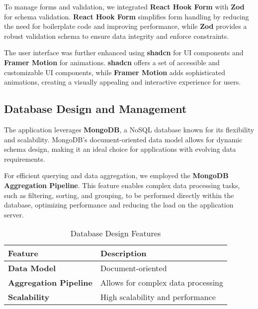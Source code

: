 To manage forms and validation, we integrated \textbf{React Hook Form} with \textbf{Zod} for schema validation. \textbf{React Hook Form} simplifies form handling by reducing the need for boilerplate code and improving performance, while \textbf{Zod} provides a robust validation schema to ensure data integrity and enforce constraints. 


The user interface was further enhanced using \textbf{shadcn} for UI components and \textbf{Framer Motion} for animations. \textbf{shadcn} offers a set of accessible and customizable UI components, while \textbf{Framer Motion} adds sophisticated animations, creating a visually appealing and interactive experience for users.

\subsection{Database Design and Management}

The application leverages \textbf{MongoDB}, a NoSQL database known for its flexibility and scalability. MongoDB's document-oriented data model allows for dynamic schema design, making it an ideal choice for applications with evolving data requirements.

For efficient querying and data aggregation, we employed the \textbf{MongoDB Aggregation Pipeline}. This feature enables complex data processing tasks, such as filtering, sorting, and grouping, to be performed directly within the database, optimizing performance and reducing the load on the application server.

\begin{table}[h]
\centering
\begin{tabular}{|l|l|}
\hline
\textbf{Feature} & \textbf{Description} \\
\hline
\textbf{Data Model} & Document-oriented \\
\textbf{Aggregation Pipeline} & Allows for complex data processing \\
\textbf{Scalability} & High scalability and performance \\
\hline
\end{tabular}
\caption{Database Design Features}
\label{tab:database_features}
\end{table}

